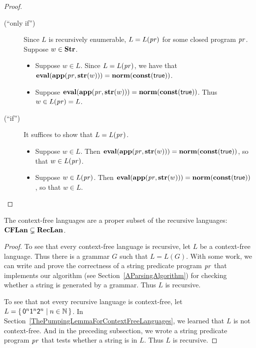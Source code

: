 \begin{proof}
\begin{description}
\item[\quad(``only if'')] Since $L$ is recursively enumerable,
  $L=L(\mathit{pr})$ for some closed program $\mathit{pr}$.  Suppose $w\in\mathbf{Str}$.
  \begin{itemize}
  \item Suppose $w\in L$.  Since $L=L(\mathit{pr})$, we have that
    $\mathbf{eval}(\mathbf{app}(\mathit{pr},\mathbf{str}(w)))=\mathbf{norm}(\mathbf{const}(\mathsf{true}))$.

  \item Suppose
    $\mathbf{eval}(\mathbf{app}(\mathit{pr},\mathbf{str}(w)))=\mathbf{norm}(\mathbf{const}(\mathsf{true}))$.
    Thus $w\in L(\mathit{pr})=L$.
  \end{itemize}

\item[\quad(``if'')] It suffices to show that $L=L(\mathit{pr})$.
  \begin{itemize}
  \item Suppose $w\in L$.  Then
    $\mathbf{eval}(\mathbf{app}(\mathit{pr},\mathbf{str}(w)))=\mathbf{norm}(\mathbf{const}(\mathsf{true}))$,
    so that $w\in L(\mathit{pr})$.

  \item Suppose $w\in L(\mathit{pr})$.  Then
    $\mathbf{eval}(\mathbf{app}(\mathit{pr},\mathbf{str}(w)))=\mathbf{norm}\allowbreak(\mathbf{const}(\mathsf{true}))$,
    so that $w\in L$.
  \end{itemize}
\end{description}
\end{proof}

%
%
\begin{theorem}
The context-free languages are a proper subset of the
recursive languages: $\mathbf{CFLan}\subsetneq\mathbf{RecLan}$.
\end{theorem}

\begin{proof}
To see that every context-free language is recursive, let $L$ be a
context-free language.  Thus there is a grammar $G$ such that
$L=L(G)$.  With some work, we can write and prove the correctness of a
string predicate program $\mathit{pr}$ that implements our algorithm (see
Section~\ref{AParsingAlgorithm}) for checking whether a string is
generated by a grammar.  Thus $L$ is recursive.

To see that not every recursive language is context-free, let
$L=\{ \, \mathsf{0}^n\mathsf{1}^n\mathsf{2}^n \mid n\in\mathbb{N} \, \}$.  In
Section~\ref{ThePumpingLemmaForContextFreeLanguages}, we
learned that $L$ is not context-free.  And in the preceding
subsection, we wrote a string predicate program $\mathit{pr}$ that tests
whether a string is in $L$.  Thus $L$ is recursive.
\end{proof}

